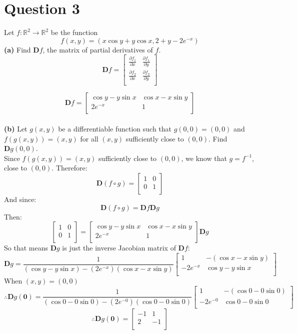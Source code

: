 \documentclass[12pt]{article}
\newcommand{\vect}[1]{\boldsymbol{#1}}
\begin{document}
\section*{Question 3}
Let $f:\mathbb{R}^2 \rightarrow \mathbb{R}^2$ be the function
\[
	f(x,y)=(x\cos y + y \cos x, 2+y-2e^{-x})
\]
\textbf{(a)} Find $\mathbf{D}f$, the matrix of partial derivatives of $f$.\\
\medskip
\[
	\mathbf{D}f=
\begin{bmatrix}
    \frac{\partial f_1}{\partial x} & \frac{\partial f_1}{\partial y} \\[10pt]
    \frac{\partial f_2}{\partial x} & \frac{\partial f_2}{\partial y} \\
\end{bmatrix}
\]

\[
	\mathbf{D}f=
\begin{bmatrix}
    \cos y - y \sin x & \cos x - x \sin y \\[0.3em]
    2e^{-x} & 1 \\
\end{bmatrix}
\]\\
\medskip
\textbf{(b)} Let $g(x,y)$ be a differentiable function such that $g(0,0)=(0,0)$ and $f(g(x,y))=(x,y)$ for all $(x, y)$ sufficiently close to $(0,0)$. Find $\textbf{D}g(0,0)$.\\
\medskip
Since $f(g(x,y))=(x,y)$ sufficiently close to $(0,0)$, we know that $g=f^{-1}$, close to $(0,0)$. Therefore:
\[
	\mathbf{D}(f\circ g)=
\begin{bmatrix}
    1 & 0 \\[0.3em]
    0 & 1 \\
\end{bmatrix}
\]
And since:
\[
	\mathbf{D}(f\circ g)=\mathbf{D}f\mathbf{D}g
\]
Then:
\[
\begin{bmatrix}
    1 & 0 \\[0.3em]
    0 & 1 \\
\end{bmatrix}
=
\begin{bmatrix}
    \cos y - y \sin x & \cos x - x \sin y \\[0.3em]
    2e^{-x} & 1 \\
\end{bmatrix}
\mathbf{D}g
\]
So that means $\mathbf{D}g$ is just the inverse Jacobian matrix of $\mathbf{D}f$:
\[
\mathbf{D}g
=
\frac{1}{(\cos y - y \sin x)-(2e^{-x})(\cos x - x \sin y)}
\begin{bmatrix} 
    1 & -(\cos x - x \sin y) \\[0.3em]
    -2e^{-x} & \cos y - y \sin x \\
\end{bmatrix}
\]
When $(x,y)=(0,0)$
\[
\therefore \mathbf{D}g(\vect{0})
=
\frac{1}{(\cos 0 - 0 \sin 0)-(2e^{-0})(\cos 0 - 0 \sin 0)}
\begin{bmatrix} 
    1 & -(\cos 0 - 0 \sin 0) \\[0.3em]
    -2e^{-0} & \cos 0 - 0 \sin 0 \\
\end{bmatrix}
\]
\[
\therefore \mathbf{D}g(\vect{0})
=
\begin{bmatrix} 
   -1 & 1 \\[0.3em]
    2 & -1 \\
\end{bmatrix}
\]
\end{document}
